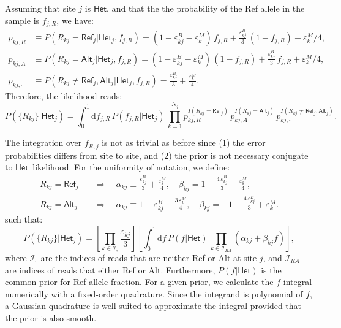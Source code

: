 \documentclass[nofootinbib,amssymb,amsmath]{revtex4}
\newcommand{\HET}{$\mathsf{Het}$}
\newcommand{\epss}{\varepsilon}
\begin{document}
\noindent{\bf Likelihood of \HET$_j$:} Assuming that site $j$ is \HET, and that the the probability of the Ref allele in the sample is $f_{j,R}$, we have:
\begin{align}
p_{kj,R} &\equiv P(R_{kj} = \mathsf{Ref}_j| \mathsf{Het}_j, f_{j,R}) = (1-\epss^B_{kj} - \epss^M_k)\,f_{j,R} + \frac{\epss^B_{kj}}{3}\,(1-f_{j,R}) + \epss^M_k/4,\nonumber\\
p_{kj,A} &\equiv P(R_{kj} = \mathsf{Alt}_j| \mathsf{Het}_j, f_{j,R}) = (1-\epss^B_{kj} - \epss^M_k)\,(1-f_{j,R}) + \frac{\epss^B_{kj}}{3}\,f_{j,R} + \epss^M_k/4,\nonumber\\
p_{kj,\circ} &\equiv P(R_{kj} \neq \mathsf{Ref}_j, \mathsf{Alt}_j| \mathsf{Het}_j, f_{j,R}) = \frac{\epss^B_{kj}}{3} + \frac{\epss^M_{k}}{4}.
\end{align}
Therefore, the likelihood reads:
\begin{equation}
P(\{R_{kj}\}|\mathsf{Het}_j) = \int_0^1 \mathrm{d} f_{j,R}\,P(f_{j,R}|\mathsf{Het}_j) \, \prod_{k=1}^{N_j} p_{kj,R}^{I(R_{kj}=\mathsf{Ref}_j)} \, p_{kj,A}^{I(R_{kj}=\mathsf{Alt}_j)}\,p_{kj,\circ}^{I(R_{kj} \neq \mathsf{Ref}_j, \mathsf{Alt}_j)}.
\end{equation}

The integration over $f_{R,j}$ is not as trivial as before since (1) the error probabilities differs from site to site, and (2) the prior is not necessary conjugate to \HET~likelihood. For the uniformity of notation, we define:
\begin{align}
R_{kj} = \mathsf{Ref}_j \quad &\Rightarrow \quad \alpha_{kj} \equiv \frac{\epss^B_{kj}}{3} + \frac{\epss^M_{k}}{4}, \quad \beta_{kj} = 1 - \frac{4\,\epss^B_{kj}}{3} - \frac{\epss^M_k}{4},\nonumber\\
R_{kj} = \mathsf{Alt}_j \quad &\Rightarrow \quad \alpha_{kj} \equiv 1 - \varepsilon^B_{kj} - \frac{3\,\epss^M_k}{4}, \quad \beta_{kj} = -1 + \frac{4 \, \epss^B_{kj}}{3} + \epss^M_k.
\end{align}
such that:
\begin{equation}\label{eq:Phet}
P(\{R_{kj}\}|\mathsf{Het}_j) = \left[\prod_{k \in \mathcal{I}_\circ} \frac{\varepsilon_{kj}}{3}\right]\left[\int_0^1 \mathrm{d} f \, P(f|\mathsf{Het})\, \prod_{k \in \mathcal{I}_{RA}}(\alpha_{kj} + \beta_{kj} f)\right],
\end{equation}
where $\mathcal{I}_\circ$ are the indices of reads that are neither Ref or Alt at site $j$, and $\mathcal{I}_{RA}$ are indices of reads that either Ref or Alt. Furthermore, $P(f|\mathsf{Het})$ is the common prior for Ref allele fraction. For a given prior, we calculate the $f$-integral numerically with a fixed-order quadrature. Since the integrand is polynomial of $f$, a Gaussian quadrature is well-suited to approximate the integral provided that the prior is also smooth.\\
\end{document}
